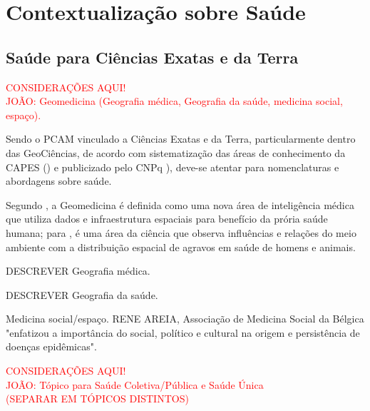 \section{Contextualização sobre Saúde}

\subsection{Saúde para Ciências Exatas e da Terra}

\begin{center}
\textcolor{red}{CONSIDERAÇÕES AQUI!}\\
\textcolor{red}{JOÃO: Geomedicina (Geografia médica, Geografia da saúde, medicina social, espaço).}\\
\end{center}

\indent Sendo o \acrfull{PCAM} vinculado a Ciências Exatas e da Terra, particularmente dentro das GeoCiências, de acordo com sistematização das áreas de conhecimento da \acrfull{CAPES} (\citeyear{CAPES_Tabela_Conhecimento}) e publicizado pelo \acrfull{CNPq} \citeyear{CNPq_Tabela_Conhecimento}), deve-se atentar para nomenclaturas e abordagens sobre saúde.

\indent Segundo , a Geomedicina é definida como uma nova área de inteligência médica que utiliza dados e infraestrutura espaciais para benefício da prória saúde humana; para , é uma área da ciência que observa influências e relações do meio ambiente com a distribuição espacial de agravos em saúde de homens e animais.

\indent DESCREVER Geografia médica.

\indent DESCREVER Geografia da saúde.

\indent Medicina social/espaço. RENE AREIA, Associação de Medicina Social da Bélgica "enfatizou a importância do social, político e cultural na origem e persistência de doenças epidêmicas".

\begin{center}
\textcolor{red}{CONSIDERAÇÕES AQUI!}\\
\indent \textcolor{red}{JOÃO: Tópico para Saúde Coletiva/Pública e Saúde Única\\(SEPARAR EM TÓPICOS DISTINTOS)}\\
\end{center}


